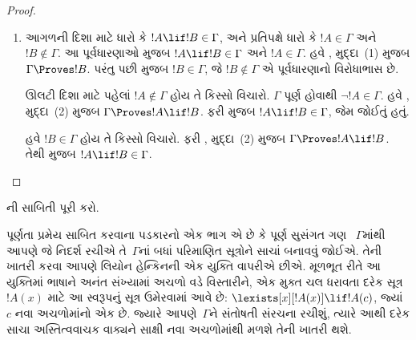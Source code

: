 \begin{proof}
\begin{enumerate}
\item %
%
આગળની દિશા માટે ધારો કે $!A \lif !B \in \Gamma$, અને પ્રતિપક્ષે ધારો
કે $!A \in \Gamma$ અને $!B \notin \Gamma$. આ પૂર્વધારણાઓ મુજબ
$!A \lif !B \in \Gamma$ અને $!A \in \Gamma$. હવે
%
  , મુદ્દા~(1) મુજબ
$\Gamma \Proves !B$. પરંતુ પછી  મુજબ
$!B \in \Gamma$, જે $!B \notin \Gamma$ એ પૂર્વધારણાનો વિરોધાભાસ છે.

ઊલટી દિશા માટે પહેલાં $!A \notin \Gamma$ હોય તે કિસ્સો વિચારો.
$\Gamma$ પૂર્ણ હોવાથી $\lnot !A \in \Gamma$. હવે
%
  , મુદ્દા~(2) મુજબ
$\Gamma \Proves !A \lif !B$. ફરી  મુજબ
$!A \lif !B \in \Gamma$, જેમ જોઈતું હતું.

હવે $!B \in \Gamma$ હોય તે કિસ્સો વિચારો. ફરી
%
  , મુદ્દા~(2) મુજબ
$\Gamma \Proves !A \lif !B$. તેથી  મુજબ
$!A \lif !B \in \Gamma$.
\end{enumerate}
\end{proof}

\begin{prob}
ની સાબિતી પૂરી કરો.
\end{prob}


\endgroup


%
  \begingroup
\makeatletter{}\makeatother


\label{guunit:OLP-0130}


\begin{explain}
પૂર્ણતા પ્રમેય સાબિત કરવાના પડકારનો એક ભાગ એ છે કે પૂર્ણ સુસંગત ગણ
~$\Gamma$માંથી આપણે જે નિદર્શ રચીએ તે~$\Gamma$નાં બધાં પરિમાણિત
સૂત્રોને સાચાં બનાવવું જોઈએ. તેની ખાતરી કરવા આપણે લિયોન હેન્કિનની
એક યુક્તિ વાપરીએ છીએ. મૂળભૂત રીતે આ યુક્તિમાં ભાષાને અનંત સંખ્યામાં
અચળો વડે વિસ્તારીને, એક મુક્ત ચલ ધરાવતા દરેક
સૂત્ર~$!A(x)$ માટે આ સ્વરૂપનું સૂત્ર ઉમેરવામાં આવે છે:
$\lexists[x][!A(x)] \lif !A(c)$,
જ્યાં~$c$ નવા અચળોમાંનો એક છે. જ્યારે આપણે~$\Gamma$ને
સંતોષતી સંરચના રચીશું, ત્યારે આથી દરેક
સાચા અસ્તિત્વવાચક વાક્યને સાક્ષી
નવા અચળોમાંથી મળશે તેની ખાતરી થશે.
\end{explain}

